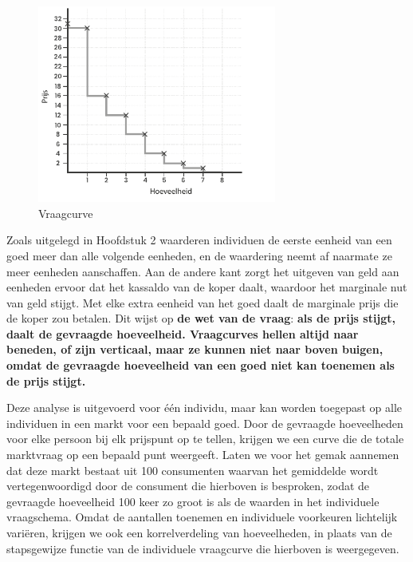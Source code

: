 \begin{figure}[H]
\centering
    \includegraphics[width=0.7\textwidth]{figures/fig21.pdf}
    \caption[Vraagcurve]{Vraagcurve}
    \label{fig21}
\end{figure}

Zoals uitgelegd in Hoofdstuk 2 waarderen individuen de eerste eenheid van een goed meer dan alle volgende eenheden, en de waardering neemt af naarmate ze meer eenheden aanschaffen. Aan de andere kant zorgt het uitgeven van geld aan eenheden ervoor dat het kassaldo van de koper daalt, waardoor het marginale nut van geld stijgt. Met elke extra eenheid van het goed daalt de marginale prijs die de koper zou betalen. Dit wijst op \textbf{de wet van de vraag}: \textbf{als de prijs stijgt, daalt de gevraagde hoeveelheid. Vraagcurves hellen altijd naar beneden, of zijn verticaal, maar ze kunnen niet naar boven buigen, omdat de gevraagde hoeveelheid van een goed niet kan toenemen als de prijs stijgt.}

Deze analyse is uitgevoerd voor één individu, maar kan worden toegepast op alle individuen in een markt voor een bepaald goed. Door de gevraagde hoeveelheden voor elke persoon bij elk prijspunt op te tellen, krijgen we een curve die de totale marktvraag op een bepaald punt weergeeft. Laten we voor het gemak aannemen dat deze markt bestaat uit 100 consumenten waarvan het gemiddelde wordt vertegenwoordigd door de consument die hierboven is besproken, zodat de gevraagde hoeveelheid 100 keer zo groot is als de waarden in het individuele vraagschema. Omdat de aantallen toenemen en individuele voorkeuren lichtelijk variëren, krijgen we ook een korrelverdeling van hoeveelheden, in plaats van de stapsgewijze functie van de individuele vraagcurve die hierboven is weergegeven.

